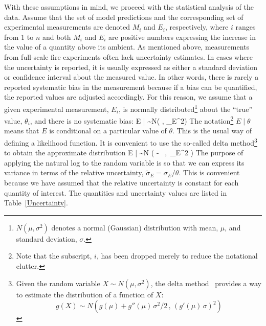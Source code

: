 With these assumptions in mind, we proceed with the statistical analysis of the data.
Assume that the set of model predictions and the corresponding set of experimental measurements are denoted
$M_i$ and $E_i$, respectively, where $i$ ranges from 1 to $n$ and both $M_i$ and $E_i$ are positive numbers
expressing the increase in the value of a quantity above its ambient.
As mentioned above, measurements from full-scale fire experiments often lack uncertainty estimates. In cases where the uncertainty is
reported, it is usually expressed as either a standard deviation or confidence interval about the measured value. In other words, there is rarely
a reported systematic bias in the measurement because if a bias can be quantified, the reported values are adjusted accordingly.
For this reason, we assume that a given experimental measurement, $E_i$, is normally
distributed\footnote{$N(\mu,\sigma^2)$ denotes a normal (Gaussian) distribution
with mean, $\mu$, and standard deviation, $\sigma$.} about the ``true'' value, $\theta_i$, and there is no systematic bias:
\be
   E \; | \; \theta \sim N(\theta \; , \; \sigma_E^2) \label{expunc}
\ee
The notation\footnote{Note that the subscript, $i$, has been dropped merely to reduce the notational clutter.}
$E \; | \; \theta$ means that $E$ is conditional on a particular value of $\theta$.
This is the usual way of defining a likelihood function.
It is convenient to use the so-called delta method\footnote{Given the random variable $X \sim N(\mu,\sigma^2)$, the
delta method~\cite{Oehlert:1992} provides a way to estimate the distribution of a function of $X$:
$$g(X) \sim N \left( g(\mu) + g''(\mu) \, \sigma^2/2 \, , \, (g'(\mu) \, \sigma)^2\right)$$} to obtain the approximate distribution
\be
   \ln E \; | \; \theta \sim N \left( \ln \theta -  \, , \,\widetilde{\sigma}_E^2 \right) \label{eeq}
\ee
The purpose of applying the natural log to the random variable is so that we can express its variance in terms of the
relative uncertainty, $\widetilde{\sigma}_E=\sigma_E/\theta$. This is convenient because we have assumed that the relative
uncertainty is constant for each quantity of interest. The quantities and uncertainty values are listed in Table~\ref{Uncertainty}.


